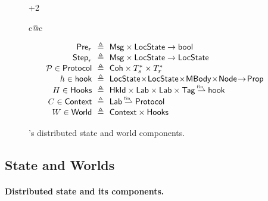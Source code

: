 \begin{figure}[t]
{\begin{varwidth}{\dimexpr\textwidth+2\fboxrule\relax}
\begin{tabular}{c@{\!\!\!\!\!\!\!\!\!\!}c}
\begin{minipage}{0.5\linewidth}
{{\[\begin{array}{r@{\ \ }c@{\ \ }l}
  \Pre_r & \eqdef & \Msg \times \LocalState \fun \bool \\
  \Step_r & \eqdef & \Msg \times \LocalState \fun \LocalState \\
  \ppr \in \Protocol & \eqdef & \mathsf{Coh} \times \Transitions_s^*
                                      \times \Transitions_r^* \\
  h \in \hook & \eqdef & \LocalState \!\times\! \LocalState \!\times\! \Mbody
                         \!\times\! \Node \!\fun\! \Prop \\
  H \in \Hooks & \eqdef & \HkId \times \Lab \times \Lab \times \Tag \pmap \hook \\
  C \in \Context & \eqdef & \Lab \pmap \Protocol \\
  W \in \World & \eqdef & \Context \times \Hooks
\end{array}
\]
}}
\end{minipage}
\end{tabular}
\end{varwidth}}
\vspace{-5pt}
\caption{\disel's distributed state and world components.}
\label{fig:sspace}
\end{figure}



\subsection{State and Worlds}
\label{sec:model}

\paragraph{Distributed state and its components.}

